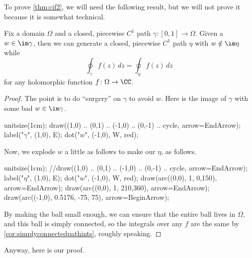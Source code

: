 To prove \autoref{thm:cif2}, we will need the following result, but we will not prove it because it is somewhat technical.
\begin{proposition} \label{prop:surgery}
	Fix a domain $\Omega$ and a closed, piecewise $C^1$ path $\gamma\colon [0,1]\to\Omega$. Given a $w\in\im\gamma$, then we can generate a closed, piecewise $C^1$ path $\eta$ with $w\notin\im\eta$ while
	\[\oint_\gamma f(z)\,dz=\oint_\eta f(z)\,dz\]
	for any holomorphic function $f\colon \Omega\to\CC$.
\end{proposition}
\begin{proof}
	The point is to do ``surgery'' on $\gamma$ to avoid $w$. Here is the image of $\gamma$ with some bad $w\in\im\gamma$.
	\begin{center}
		\begin{asy}
			unitsize(1cm);
			draw((1,0) .. (0,1) .. (-1,0) .. (0,-1) .. cycle, arrow=EndArrow);
			label("$\gamma$", (1,0), E);
			dot("$w$", (-1,0), W, red);
		\end{asy}
	\end{center}
	Now, we explode $w$ a little as follows to make our $\eta$, as follows.
	\begin{center}
		\begin{asy}
			unitsize(1cm);
			//draw((1,0) .. (0,1) .. (-1,0) .. (0,-1) .. cycle, arrow=EndArrow);
			label("$\eta$", (1,0), E);
			dot("$w$", (-1,0), W, red);
			draw(arc((0,0), 1, 0,150), arrow=EndArrow);
			draw(arc((0,0), 1, 210,360), arrow=EndArrow);
			draw(arc((-1,0), 0.5176, -75, 75), arrow=BeginArrow);
		\end{asy}
	\end{center}
	By making the ball small enough, we can ensure that the entire ball lives in $\Omega$, and this ball is simply connected, so the integrals over any $f$ are the same by \autoref{cor:simplyconnectedpathints}, roughly speaking.
\end{proof}
Anyway, here is our proof.
